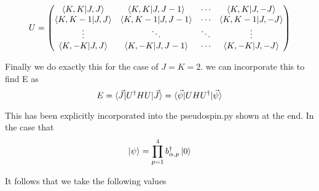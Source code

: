 \documentclass[11pt]{article} %
\begin{document}
\begin{equation}
U=\begin{pmatrix} 
\braket{K,K|J,J}&\braket{K,K|J,J-1}& \cdots & \braket{K,K|J,-J}\\
\braket{K,K-1|J,J}&\braket{K,K-1|J,J-1}& \cdots & \braket{K,K-1|J,-J}\\
\vdots &\ddots & \ddots & \vdots \\
\braket{K,-K|J,J}&\braket{K,-K|J,J-1}& \cdots & \braket{K,-K|J,-J}\\
\end{pmatrix}
\end{equation}


Finally we do exactly this for the case of $J=K=2$. we can incorporate this to find E as\\

\begin{equation}
E=\braket{\vec{J}|U^\dagger H U |\vec{J}}=\braket{\vec{\psi}|U H U^\dagger |\vec{\psi}} \end{equation}

This has been explicitly incorporated into the pseudospin.py shown at the end. In the case that \\
\begin{equation}
\ket{\psi}=\prod_{p=1}^4 b_{\alpha,p}^\dagger \ket{0} \end{equation}

It follows that we take the following values\\
\end{document}

